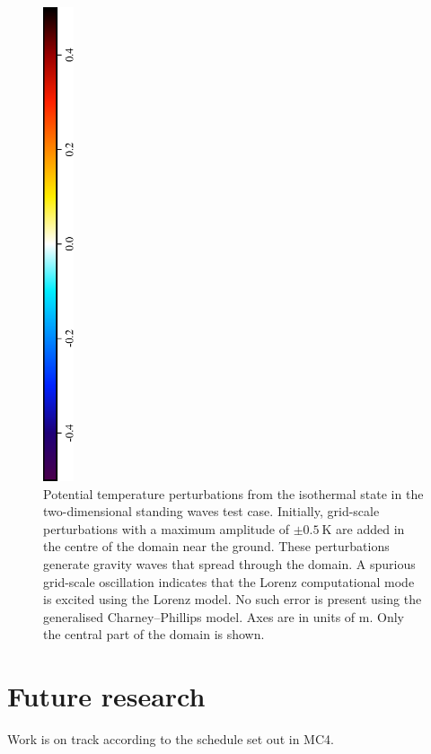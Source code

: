 \documentclass[a4paper,11pt]{article}
\begin{document}
\begin{figure}
\includegraphics[height=5.5in,angle=270]{theta-diff-legend.eps}
\caption{Potential temperature perturbations from the isothermal state in the two-dimensional standing waves test case.  Initially, grid-scale perturbations with a maximum amplitude of $\pm \SI{0.5}{\kelvin}$ are added in the centre of the domain near the ground.  These perturbations generate gravity waves that spread through the domain.  A spurious grid-scale oscillation indicates that the Lorenz computational mode is excited using the Lorenz model.  No such error is present using the generalised Charney--Phillips model.  Axes are in units of \si{\meter}.  Only the central part of the domain is shown.}
\label{fig:cp-results}
\end{figure}

\section{Future research}

Work is on track according to the schedule set out in MC4.



\end{document}
